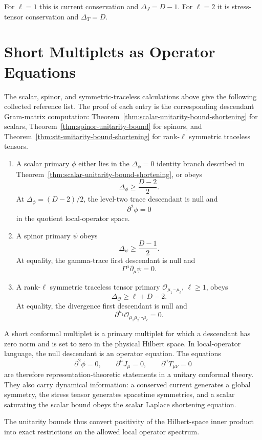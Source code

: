For \(\ell=1\) this is current conservation and
\(\Delta_J=D-1\).  For \(\ell=2\) it is stress-tensor conservation and
\(\Delta_T=D\).

\section{Short Multiplets as Operator Equations}
\label{sec:short-multiplets-operator-equations}

The scalar, spinor, and symmetric-traceless calculations above give the
following collected reference list.  The proof of each entry is the
corresponding descendant Gram-matrix computation:
Theorem~\ref{thm:scalar-unitarity-bound-shortening} for scalars,
Theorem~\ref{thm:spinor-unitarity-bound} for spinors, and
Theorem~\ref{thm:stt-unitarity-bound-shortening} for rank-\(\ell\)
symmetric traceless tensors.
\begin{enumerate}
  \item A scalar primary \(\phi\) either lies in the \(\Delta_\phi=0\)
  identity branch described in
  Theorem~\ref{thm:scalar-unitarity-bound-shortening}, or obeys
  \[
    \Delta_\phi\ge\frac{D-2}{2}.
  \]
  At \(\Delta_\phi=(D-2)/2\), the level-two trace descendant is null and
  \[
    \partial^2\phi=0
  \]
  in the quotient local-operator space.
  \item A spinor primary \(\psi\) obeys
  \[
    \Delta_\psi\ge\frac{D-1}{2}.
  \]
  At equality, the gamma-trace first descendant is null and
  \[
    \Gamma^\mu\partial_\mu\psi=0.
  \]
  \item A rank-\(\ell\) symmetric traceless tensor primary
  \(\mathcal O_{\mu_1\cdots\mu_\ell}\), \(\ell\ge1\), obeys
  \[
    \Delta_{\mathcal O}\ge\ell+D-2.
  \]
  At equality, the divergence first descendant is null and
  \[
    \partial^{\mu_1}\mathcal O_{\mu_1\mu_2\cdots\mu_\ell}=0.
  \]
\end{enumerate}

A short conformal multiplet is a primary multiplet for which a descendant has
zero norm and is set to zero in the physical Hilbert space.  In local-operator
language, the null descendant is an operator equation.  The equations
\[
  \partial^2\phi=0,\qquad
  \partial^\mu J_\mu=0,\qquad
  \partial^\mu T_{\mu\nu}=0
\]
are therefore representation-theoretic statements in a unitary conformal
theory.  They also carry dynamical information: a conserved current generates
a global symmetry, the stress tensor generates spacetime symmetries, and a
scalar saturating the scalar bound obeys the scalar Laplace shortening equation.

The unitarity bounds thus convert positivity of the Hilbert-space inner
product into exact restrictions on the allowed local operator spectrum.
